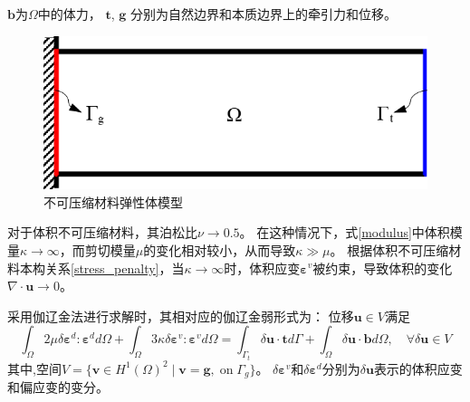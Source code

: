 $\boldsymbol b$为$\Omega$中的体力， $\boldsymbol t$, $\boldsymbol g$ 分别为自然边界和本质边界上的牵引力和位移。
\begin{figure}[H]
    \centering 
        \includegraphics[scale=0.7]{figures/model.png}
        \caption{不可压缩材料弹性体模型}\label{model}
\end{figure}

对于体积不可压缩材料，其泊松比$\nu \rightarrow 0.5$。 在这种情况下，式\eqref{modulus}中体积模量$\kappa \rightarrow \infty$，而剪切模量$\mu$的变化相对较小，从而导致$\kappa\gg\mu$。
根据体积不可压缩材料本构关系\eqref{stress_penalty}，当$\kappa \rightarrow \infty$时，体积应变$\boldsymbol \varepsilon^v$被约束，导致体积的变化$\nabla \cdot \boldsymbol u\rightarrow 0$。

采用伽辽金法进行求解时，其相对应的伽辽金弱形式为：
位移$\boldsymbol u \in V$满足
\begin{equation}\label{weak_penalty}
\int_\Omega 2\mu \delta \boldsymbol \varepsilon^d : \boldsymbol \varepsilon^d d\Omega +
\int_\Omega 3\kappa \delta \boldsymbol \varepsilon^v : \boldsymbol \varepsilon^v d\Omega =
\int_{\Gamma_t} \delta \boldsymbol u \cdot \boldsymbol t d\Gamma + \int_\Omega \delta \boldsymbol u \cdot \boldsymbol b d\Omega, \quad
\forall \delta \boldsymbol u \in V
\end{equation}
其中,空间$V=\{\boldsymbol v \in H^1(\Omega)^2\;\vert\;\boldsymbol v = \boldsymbol g, \; \textrm{on} \; \Gamma_g\}$。
$\delta\boldsymbol \varepsilon^v$和$\delta\boldsymbol \varepsilon^d $分别为$\delta \boldsymbol u$表示的体积应变和偏应变的变分。

